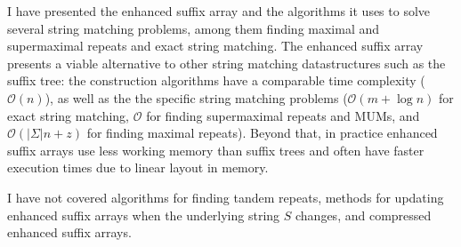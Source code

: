 \documentclass[a4paper,10pt]{article}
\begin{document}
I have presented the enhanced suffix array and the algorithms it uses
to solve several string matching problems, among them finding maximal
and supermaximal repeats and exact string matching.
The enhanced suffix array presents a viable alternative to other string
matching datastructures such as the suffix tree: the construction
algorithms have a comparable time complexity ($\mathcal{O}(n)$), as well
as the the specific string matching problems ($\mathcal{O}(m + \log n)$
for exact string matching, $\mathcal{O}$ for finding supermaximal repeats
and MUMs, and $\mathcal{O}(|\Sigma|n+z)$ for finding maximal repeats).
Beyond that, in practice enhanced suffix arrays use less working memory
than suffix trees and often have faster execution times due to linear
layout in memory.

I have not covered algorithms for finding tandem repeats, methods for
updating enhanced suffix arrays when the underlying string $S$ changes,
and compressed enhanced suffix arrays.



\end{document}
